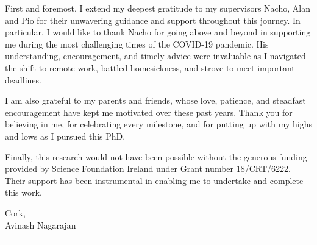 
\def\mydate{\leavevmode\hbox{\twodigits\day.\twodigits\month.\the\year}}
\def\twodigits#1{\ifnum#1<10 0\fi\the#1}

\begin{acknowledgements}
First and foremost, I extend my deepest gratitude to my supervisors Nacho, Alan and Pio for their unwavering guidance and support throughout this journey. In particular, I would like to thank Nacho for going above and beyond in supporting me during the most challenging times of the COVID-19 pandemic. His understanding, encouragement, and timely advice were invaluable as I navigated the shift to remote work, battled homesickness, and strove to meet important deadlines.

I am also grateful to my parents and friends, whose love, patience, and steadfast encouragement have kept me motivated over these past years. Thank you for believing in me, for celebrating every milestone, and for putting up with my highs and lows as I pursued this PhD.

Finally, this research would not have been possible without the generous funding provided by Science Foundation Ireland under Grant number 18/CRT/6222. Their support has been instrumental in enabling me to undertake and complete this work.




\vspace{1cm}
\noindent
\begin{minipage}[t]{\textwidth}
\begin{flushright}
Cork,  \\
Avinash Nagarajan
\end{flushright}
\end{minipage}

\vspace{1cm}
\noindent
\begin{minipage}[t]{\textwidth}
\centering
\rule{0.10\textwidth}{0.4pt}
\end{minipage}
\vspace{1cm}


\end{acknowledgements}
